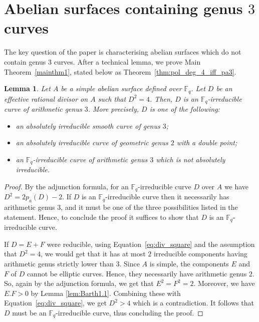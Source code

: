 \documentclass[11pt]{amsart}
\newcommand\F{\mathbb{F}}
\newcommand\Fq{\mathbb{F}_q}
\theoremstyle{plain}
\newtheorem{lemma}[theorem]{Lemma}
\theoremstyle{definition}
\begin{document}
\section{Abelian surfaces containing genus \texorpdfstring{$3$}{3} curves}\label{sec:g3onsurf}
The key question of the paper is characterising abelian surfaces which do not contain genus $3$ curves.
After a technical lemma, we prove Main Theorem~\ref{mainthm1}, stated below as Theorem~\ref{thm:pol_deg_4_iff_pa3}.
\begin{lemma}\label{lem:div4}
    Let $A$ be a simple abelian surface defined over $\Fq$. Let $D$ be an effective rational divisor on $A$ such that $D^2=4$. Then, $D$ is an $\Fq$-irreducible curve of arithmetic genus $3$. More precisely, $D$ is one of the following:
    \begin{itemize}
    \item an absolutely irreducible smooth curve of genus $3$;
    \item an absolutely irreducible curve of geometric genus $2$ with a double point;
    \item an $\Fq$-irreducible curve of arithmetic genus $3$ which is not absolutely irreducible.
    \end{itemize}
\end{lemma}
\begin{proof}
    By the adjunction formula, for an $\Fq$-irreducible curve $D$ over $A$ we have $D^2=2p_a(D)-2$.
    If $D$ is an $\Fq$-irreducible curve then it necessarily has arithmetic genus $3$,
    and it must be one of the three possibilities listed in the statement.
    Hence, to conclude the proof it suffices to show that $D$ is an $\Fq$-irreducible curve.

    If $D=E+F$ were reducible, using Equation~\eqref{eq:div_square}
    and the assumption that $D^2=4$, we would get that it has at most $2$ irreducible components having arithmetic genus strictly lower than $3$.
    Since $A$ is simple, the components $E$ and $F$ of $D$ cannot be elliptic curves.
    Hence, they necessarily have arithmetic genus $2$.
    So, again by the adjunction formula, we get that $E^2=F^2=2$.
    Moreover, we have $E.F>0$ by Lemma \ref{lem:Barth1.1}.
    Combining these with Equation~\eqref{eq:div_square}, we get $D^2>4$ which is a contradiction.
    It follows that $D$ must be an $\F_q$-irreducible curve, thus concluding the proof.
 \end{proof}
\end{document}
